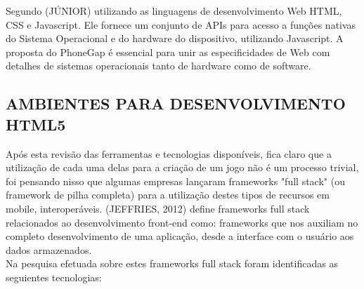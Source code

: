\documentclass{article}
\begin{document}
Segundo (JÚNIOR) utilizando as linguagens de desenvolvimento Web HTML, CSS e Javascript. Ele fornece um conjunto de APIs para acesso a funções nativas do Sistema Operacional e do hardware do dispositivo, utilizando Javascript. A proposta do PhoneGap é essencial para unir as especificidades de Web com detalhes de sistemas operacionais tanto de hardware como de software. 

\subsection{AMBIENTES PARA DESENVOLVIMENTO HTML5}

Após esta revisão das ferramentas  e tecnologias disponíveis, fica claro que a utilização de cada uma delas para a criação de um jogo não é um processo trivial, foi pensando nisso que algumas empresas lançaram frameworks "full stack"  (ou framework de pilha completa) para a utilização destes tipos de recursos em mobile, interoperáveis. (JEFFRIES, 2012) define frameworks full stack relacionados ao desenvolvimento front-end como: frameworks que nos auxiliam no completo desenvolvimento de uma aplicação, desde a interface com o usuário aos dados armazenados. 
\\
Na pesquisa efetuada sobre estes frameworks full stack foram identificadas as seguientes tecnologias: 
\end{document}
